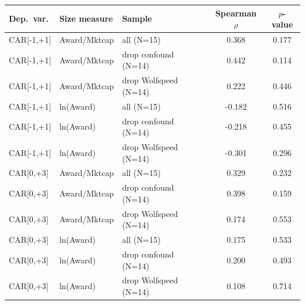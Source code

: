\begin{tabular}{lllcc}
\toprule
Dep.\ var. & Size measure & Sample & Spearman $\rho$ & $p$-value \\
\midrule
CAR[-1,+1] & Award/Mktcap & all (N=15) & 0.368 & 0.177 \\
CAR[-1,+1] & Award/Mktcap & drop confound (N=14) & 0.442 & 0.114 \\
CAR[-1,+1] & Award/Mktcap & drop Wolfspeed (N=14) & 0.222 & 0.446 \\
CAR[-1,+1] & ln(Award) & all (N=15) & -0.182 & 0.516 \\
CAR[-1,+1] & ln(Award) & drop confound (N=14) & -0.218 & 0.455 \\
CAR[-1,+1] & ln(Award) & drop Wolfspeed (N=14) & -0.301 & 0.296 \\
CAR[0,+3] & Award/Mktcap & all (N=15) & 0.329 & 0.232 \\
CAR[0,+3] & Award/Mktcap & drop confound (N=14) & 0.398 & 0.159 \\
CAR[0,+3] & Award/Mktcap & drop Wolfspeed (N=14) & 0.174 & 0.553 \\
CAR[0,+3] & ln(Award) & all (N=15) & 0.175 & 0.533 \\
CAR[0,+3] & ln(Award) & drop confound (N=14) & 0.200 & 0.493 \\
CAR[0,+3] & ln(Award) & drop Wolfspeed (N=14) & 0.108 & 0.714 \\
\bottomrule
\end{tabular}